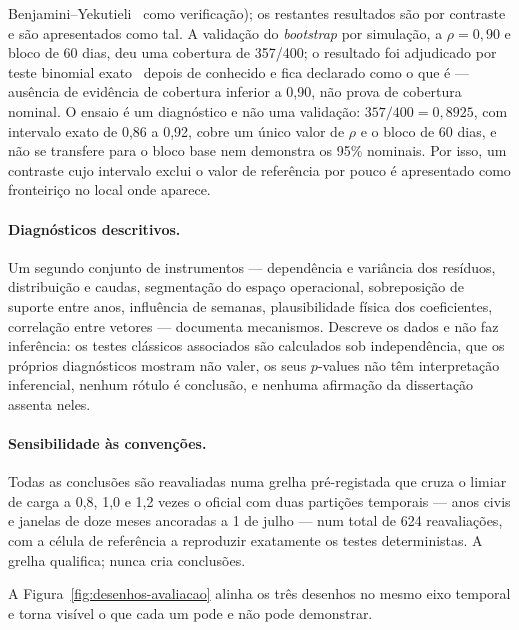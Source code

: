 Benjamini--Yekutieli~\cite{BenjaminiYekutieli2001} como verificação); os restantes resultados são por
contraste e são apresentados como tal. A validação do \emph{bootstrap} por
simulação, a $\rho = 0{,}90$ e bloco de 60 dias, deu uma cobertura de
357/400; o resultado foi adjudicado por teste binomial exato~\cite{ClopperPearson1934}
depois de conhecido e fica declarado como o que é --- ausência de evidência de
cobertura inferior a 0,90, não prova de cobertura nominal. O ensaio é um
diagnóstico e não uma validação: $357/400 = 0{,}8925$, com intervalo exato de
0,86 a 0,92, cobre um único valor de $\rho$ e o bloco de 60 dias, e não se
transfere para o bloco base nem demonstra os 95\% nominais. Por isso, um
contraste cujo intervalo exclui o valor de referência por pouco é
apresentado como fronteiriço no local onde aparece.

\paragraph{Diagnósticos descritivos.} Um segundo conjunto de instrumentos
--- dependência e variância dos resíduos, distribuição e caudas,
segmentação do espaço operacional, sobreposição de suporte entre anos,
influência de semanas, plausibilidade física dos coeficientes, correlação
entre vetores --- documenta mecanismos. Descreve os dados e não faz
inferência: os testes clássicos associados são calculados sob independência,
que os próprios diagnósticos mostram não valer, os seus $p$-values não têm
interpretação inferencial, nenhum rótulo é conclusão, e nenhuma afirmação da
dissertação assenta neles.

\paragraph{Sensibilidade às convenções.} Todas as conclusões são
reavaliadas numa grelha pré-registada que cruza o limiar de carga a 0,8,
1,0 e 1,2 vezes o oficial com duas partições temporais --- anos civis e
janelas de doze meses ancoradas a 1 de julho --- num total de 624
reavaliações, com a célula de referência a reproduzir exatamente os testes
deterministas. A grelha qualifica; nunca cria conclusões.

A Figura~\ref{fig:desenhos-avaliacao} alinha os três desenhos no mesmo eixo temporal e torna visível o que cada um pode e não pode demonstrar.


